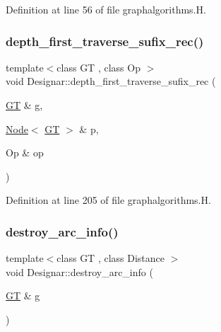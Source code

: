 Definition at line 56 of file graphalgorithms.\+H.

\mbox{\label{namespace_designar_ab028f52b5df8eed5dadeda85d45fa0f2}} 
\subsubsection{\texorpdfstring{depth\+\_\+first\+\_\+traverse\+\_\+sufix\+\_\+rec()}{depth\_first\_traverse\_sufix\_rec()}}
{\footnotesize\ttfamily template$<$class GT , class Op $>$ \\
void Designar\+::depth\+\_\+first\+\_\+traverse\+\_\+sufix\+\_\+rec (\begin{DoxyParamCaption}\item[{\hyperlink{demo-buildgraph_8_c_a3001c40d2c31ca87ed96cd7d1334a55e}{GT} \&}]{g,  }\item[{\hyperlink{namespace_designar_a5af326c65aa2bd26b26c410f2030d09e}{Node}$<$ \hyperlink{demo-buildgraph_8_c_a3001c40d2c31ca87ed96cd7d1334a55e}{GT} $>$ \&}]{p,  }\item[{Op \&}]{op }\end{DoxyParamCaption})}



Definition at line 205 of file graphalgorithms.\+H.

\mbox{\label{namespace_designar_ae7f5b6163106f0008d39cbed1cb8eaa2}} 
\subsubsection{\texorpdfstring{destroy\+\_\+arc\+\_\+info()}{destroy\_arc\_info()}}
{\footnotesize\ttfamily template$<$class GT , class Distance $>$ \\
void Designar\+::destroy\+\_\+arc\+\_\+info (\begin{DoxyParamCaption}\item[{\hyperlink{demo-buildgraph_8_c_a3001c40d2c31ca87ed96cd7d1334a55e}{GT} \&}]{g }\end{DoxyParamCaption})}



